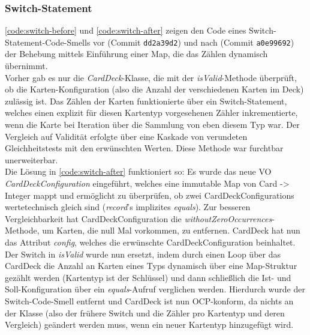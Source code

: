 

\subsubsection{Switch-Statement} 

\autoref{code:switch-before} und \autoref{code:switch-after} zeigen den Code eines Switch-Statement-Code-Smells 
vor (Commit \texttt{dd2a39d2}) und nach (Commit \texttt{a0e99692}) der Behebung mittels Einführung einer 
Map, die das Zählen dynamisch übernimmt. \\ 
Vorher gab es nur die \textit{CardDeck}-Klasse, die mit der \textit{isValid}-Methode überprüft, 
ob die Karten-Konfiguration (also die Anzahl der verschiedenen Karten im Deck) zulässig ist. 
Das Zählen der Karten funktionierte über ein Switch-Statement, welches einen explizit für diesen 
Kartentyp vorgesehenen Zähler inkrementierte, wenn die Karte bei Iteration über die Sammlung von eben diesem Typ war.
Der Vergleich auf Validität erfolgte über eine Kaskade von verundeten Gleichheitstests mit den erwünschten Werten. 
Diese Methode war furchtbar unerweiterbar. \\
Die Lösung in \autoref{code:switch-after} funktioniert so: Es wurde das neue VO \textit{CardDeckConfiguration} 
eingeführt, welches eine immutable Map von Card -> Integer mappt und ermöglicht zu überprüfen, ob zwei 
CardDeckConfigurations wertetechnisch gleich sind (\textit{record}'s implizites \textit{equals}). Zur 
besseren Vergleichbarkeit hat CardDeckConfiguration die \textit{withoutZeroOccurrences}-Methode, um Karten, 
die null Mal vorkommen, zu entfernen. CardDeck hat nun das Attribut \textit{config}, welches die erwünschte 
CardDeckConfiguration beinhaltet. Der Switch in \textit{isValid} wurde nun ersetzt, indem durch einen 
Loop über das CardDeck die Anzahl an Karten eines Typs dynamisch über eine Map-Struktur gezählt werden (Kartentyp 
ist der Schlüssel) und dann schließlich die Ist- und Soll-Konfiguration über ein \textit{equals}-Aufruf verglichen 
werden. Hierdurch wurde der Switch-Code-Smell entfernt und CardDeck ist nun OCP-konform, da nichts an der Klasse 
(also der frühere Switch und die Zähler pro Kartentyp und deren Vergleich) geändert werden muss, wenn ein neuer 
Kartentyp hinzugefügt wird.   

